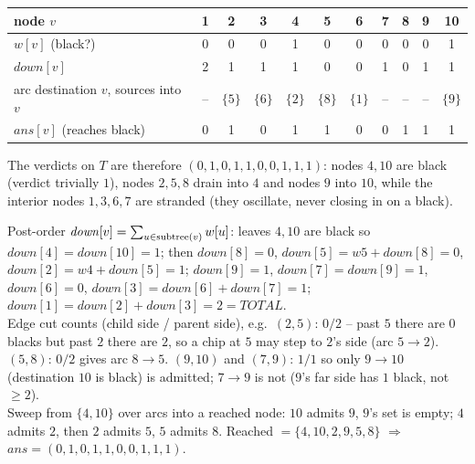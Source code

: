 \begin{center}
\footnotesize
\renewcommand{\arraystretch}{1.2}
\begin{tabular}{l|cccccccccc}
\toprule
node $v$ & 1 & 2 & 3 & 4 & 5 & 6 & 7 & 8 & 9 & 10 \\
\midrule
$w[v]$ (black?) & 0 & 0 & 0 & 1 & 0 & 0 & 0 & 0 & 0 & 1 \\
$\mathit{down}[v]$ & 2 & 1 & 1 & 1 & 0 & 0 & 1 & 0 & 1 & 1 \\
arc destination $v$, sources into $v$ & -- & $\{5\}$ & $\{6\}$ & $\{2\}$ & $\{8\}$ & $\{1\}$ & -- & -- & -- & $\{9\}$ \\
$\mathit{ans}[v]$ (reaches black) & 0 & 1 & 0 & 1 & 1 & 0 & 0 & 1 & 1 & 1 \\
\bottomrule
\end{tabular}
\end{center}

\noindent The verdicts on $T$ are therefore $(0,1,0,1,1,0,0,1,1,1)$: nodes $4,10$
are black (verdict trivially $1$), nodes $2,5,8$ drain into $4$ and nodes $9$ into
$10$, while the interior nodes $1,3,6,7$ are stranded (they oscillate, never
closing in on a black).

\begin{tracebox}
Post-order $\mathit{down}[v]=\sum_{u\in\operatorname{subtree}(v)}w[u]$: leaves $4,10$ are black
so $\mathit{down}[4]{=}\mathit{down}[10]{=}1$; then $\mathit{down}[8]{=}0$,
$\mathit{down}[5]{=}w5{+}\mathit{down}[8]{=}0$, $\mathit{down}[2]{=}w4{+}\mathit{down}
[5]{=}1$; $\mathit{down}[9]{=}1$, $\mathit{down}[7]{=}\mathit{down}[9]{=}1$,
$\mathit{down}[6]{=}0$, $\mathit{down}[3]{=}\mathit{down}[6]{+}\mathit{down}[7]{=}1$;
$\mathit{down}[1]{=}\mathit{down}[2]{+}\mathit{down}[3]{=}2=\mathit{TOTAL}$. \checkmark\\
Edge cut counts (child side / parent side), e.g.\ $(2,5)$: $0/2$ -- past $5$ there
are $0$ blacks but past $2$ there are $2$, so a chip at $5$ may step to $2$'s side
(arc $5\!\to\!2$). $(5,8)$: $0/2$ gives arc $8\!\to\!5$. $(9,10)$ and $(7,9)$: $1/1$
so only $9\!\to\!10$ (destination $10$ is black) is admitted; $7\!\to\!9$ is not
($9$'s far side has $1$ black, not $\ge2$).\\
Sweep from $\{4,10\}$ over arcs into a reached node: $10$ admits $9$, $9$'s set is
empty; $4$ admits $2$, then $2$ admits $5$, $5$ admits $8$. Reached
$=\{4,10,2,9,5,8\}$ $\Rightarrow$ $\mathit{ans}=(0,1,0,1,1,0,0,1,1,1)$. \checkmark
\end{tracebox}


